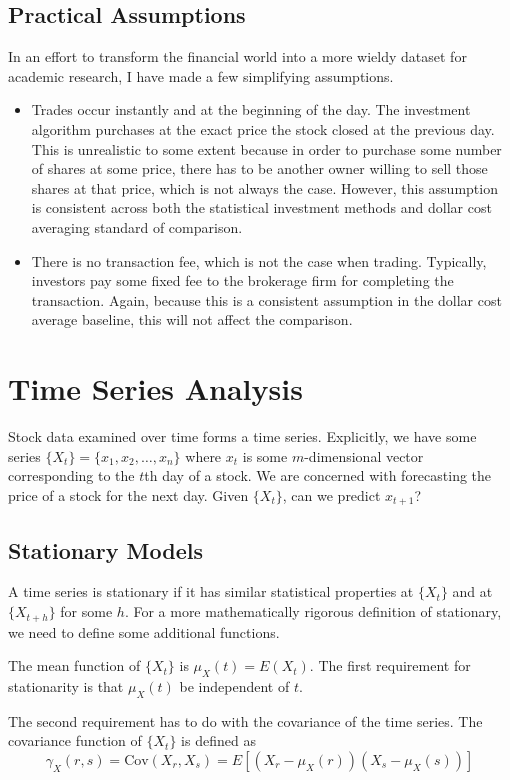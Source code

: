 \documentclass[12pt]{article}
\begin{document}
\subsection{Practical Assumptions}
In an effort to transform the financial world into a more wieldy dataset for academic research, I have made a few simplifying assumptions.
\begin{itemize}
	\item Trades occur instantly and at the beginning of the day. The investment algorithm purchases at the exact price the stock closed at the previous day. This is unrealistic to some extent because in order to purchase some number of shares at some price, there has to be another owner willing to sell those shares at that price, which is not always the case. However, this assumption is consistent across both the statistical investment methods and dollar cost averaging standard of comparison.
	
	\item There is no transaction fee, which is not the case when trading. Typically, investors pay some fixed fee to the brokerage firm for completing the transaction. Again, because this is a consistent assumption in the dollar cost average baseline, this will not affect the comparison.
			
\end{itemize}
\section{Time Series Analysis}
Stock data examined over time forms a time series. Explicitly, we have some series $\{X_t\} = \{x_1, x_2, \dots, x_n\}$ where $x_t$ is some $m$-dimensional vector corresponding to the $t$th day of a stock. We are concerned with forecasting the price of a stock for the next day. Given $\{X_t\}$, can we predict $x_{t+1}$?

\subsection{Stationary Models}  
A time series is stationary if it has similar statistical properties at $\{X_t\}$ and at $\{X_{t+h}\}$ for some $h$. For a more mathematically rigorous definition of stationary, we need to define some additional functions.

The mean function of $\{X_t\}$ is $\mu_X(t) = E(X_t)$. The first requirement for stationarity is that $\mu_X(t)$ be independent of $t$. 

The second requirement has to do with the covariance of the time series. The covariance function of $\{X_t\}$ is defined as
$$\gamma _X(r,s) = \text{Cov}(X_r, X_s) = E[(X_r - \mu _X(r))(X_s - \mu_X(s))]$$
\end{document}
